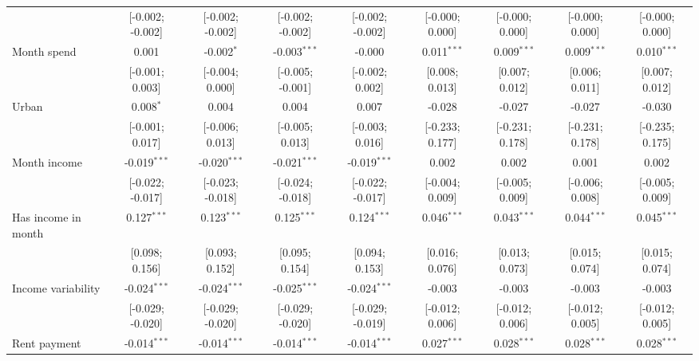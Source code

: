 \begin{table}[htbp]
\begin{threeparttable}[b]
\begin{tabular}{lcccccccc}
                                     & [-0.002; -0.002] & [-0.002; -0.002] & [-0.002; -0.002] & [-0.002; -0.002] & [-0.000; 0.000] & [-0.000; 0.000]  & [-0.000; 0.000]  & [-0.000; 0.000]\\   
         Month spend                 & 0.001            & -0.002$^{*}$     & -0.003$^{***}$   & -0.000           & 0.011$^{***}$   & 0.009$^{***}$    & 0.009$^{***}$    & 0.010$^{***}$\\   
                                     & [-0.001; 0.003]  & [-0.004; 0.000]  & [-0.005; -0.001] & [-0.002; 0.002]  & [0.008; 0.013]  & [0.007; 0.012]   & [0.006; 0.011]   & [0.007; 0.012]\\   
         Urban                       & 0.008$^{*}$      & 0.004            & 0.004            & 0.007            & -0.028          & -0.027           & -0.027           & -0.030\\   
                                     & [-0.001; 0.017]  & [-0.006; 0.013]  & [-0.005; 0.013]  & [-0.003; 0.016]  & [-0.233; 0.177] & [-0.231; 0.178]  & [-0.231; 0.178]  & [-0.235; 0.175]\\   
         Month income                & -0.019$^{***}$   & -0.020$^{***}$   & -0.021$^{***}$   & -0.019$^{***}$   & 0.002           & 0.002            & 0.001            & 0.002\\   
                                     & [-0.022; -0.017] & [-0.023; -0.018] & [-0.024; -0.018] & [-0.022; -0.017] & [-0.004; 0.009] & [-0.005; 0.009]  & [-0.006; 0.008]  & [-0.005; 0.009]\\   
         Has income in month         & 0.127$^{***}$    & 0.123$^{***}$    & 0.125$^{***}$    & 0.124$^{***}$    & 0.046$^{***}$   & 0.043$^{***}$    & 0.044$^{***}$    & 0.045$^{***}$\\   
                                     & [0.098; 0.156]   & [0.093; 0.152]   & [0.095; 0.154]   & [0.094; 0.153]   & [0.016; 0.076]  & [0.013; 0.073]   & [0.015; 0.074]   & [0.015; 0.074]\\   
         Income variability          & -0.024$^{***}$   & -0.024$^{***}$   & -0.025$^{***}$   & -0.024$^{***}$   & -0.003          & -0.003           & -0.003           & -0.003\\   
                                     & [-0.029; -0.020] & [-0.029; -0.020] & [-0.029; -0.020] & [-0.029; -0.019] & [-0.012; 0.006] & [-0.012; 0.006]  & [-0.012; 0.005]  & [-0.012; 0.005]\\   
         Rent payment                & -0.014$^{***}$   & -0.014$^{***}$   & -0.014$^{***}$   & -0.014$^{***}$   & 0.027$^{***}$   & 0.028$^{***}$    & 0.028$^{***}$    & 0.028$^{***}$\\   

\end{tabular}
\end{threeparttable}
\end{table}
